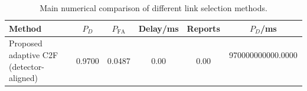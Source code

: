 \begin{table}[t]
    \centering
    \caption{Main numerical comparison of different link selection methods.}
    \label{tab:main_summary}
    \begin{tabular}{l c c c c c}
        \hline
        Method & $P_D$ & $P_{\mathrm{FA}}$ & Delay/ms & Reports & $P_D$/ms \\
        \hline
        Proposed adaptive C2F (detector-aligned) & 0.9700 & 0.0487 & 0.00 & 0.00 & 970000000000.0000 \
        \hline
    \end{tabular}
\end{table}
